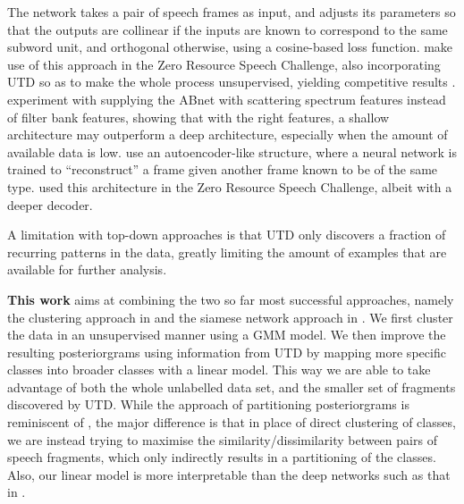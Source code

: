The network takes a pair of speech frames as input, and adjusts its parameters so that the outputs are collinear if the inputs are known to correspond to the same subword unit, and orthogonal otherwise, using a cosine-based loss function.
\textcite{thiolliere2015hybrid} make use of this approach in the Zero Resource Speech Challenge, also incorporating UTD so as to make the whole process unsupervised, yielding competitive results \parencite{versteegh2016zero}.
\textcite{zeghidour2016deep} experiment with supplying the ABnet with scattering spectrum features instead of filter bank features, showing that with the right features, a shallow architecture may outperform a deep architecture, especially when the amount of available data is low.
\textcite{kamper2015unsupervised} use an autoencoder-like structure, where a neural network is trained to ``reconstruct'' a frame given another frame known to be of the same type.
\textcite{renshaw2015comparison} used this architecture in the Zero Resource Speech Challenge, albeit with a deeper decoder.

A limitation with top-down approaches is that UTD only discovers a fraction of recurring patterns in the data, greatly limiting the amount of examples that are available for further analysis.

\textbf{This work} %
aims at combining the two so far most successful approaches, namely the clustering approach in \parencite{chen2015parallel} and the siamese network approach in \parencite{thiolliere2015hybrid}.
We first cluster the data in an unsupervised manner using a GMM model.
We then improve the resulting posteriorgrams using information from UTD by mapping more specific classes into broader classes with a linear model.
This way we are able to take advantage of both the whole unlabelled data set, and the smaller set of fragments discovered by UTD.
While the approach of partitioning posteriorgrams is reminiscent of \parencite{jansen2013weak}, the major difference is that in place of direct clustering of classes, we are instead trying to maximise the similarity/dissimilarity between pairs of speech fragments, which only indirectly results in a partitioning of the classes.
Also, our linear model is more interpretable than the deep networks such as that in \parencite{thiolliere2015hybrid}.

